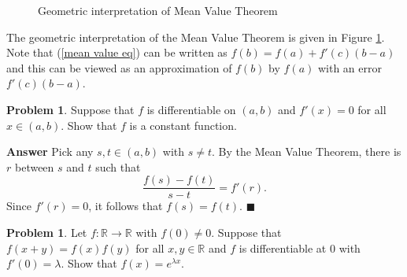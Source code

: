 \documentclass[12pt,letterpaper]{book}
\def\red{\textcolor{red}}
\def\blue{\textcolor{blue}}
\numberwithin{equation}{section}
\theoremstyle{definition}
\newtheorem{problem}[thm]{\textbf{Problem}}
\newenvironment{answer}{\noindent\textbf{Answer}}{\hfill$\blacksquare$\vspace{0.1in}}
\begin{document}
\begin{figure}[h]
\begin{center}
\end{center}
\caption{Geometric interpretation of Mean Value Theorem}
\label{mean value fig}
\end{figure}

The geometric interpretation of the Mean Value Theorem is given in Figure \ref{mean value fig}. Note that (\ref{mean value eq}) can be written as $f(b)=f(a)+f'(c)(b-a)$ and this can be viewed as an approximation of $f(b)$ by $f(a)$ with an error $f'(c)(b-a)$.

\begin{problem}\label{must be constant}
Suppose that $f$ is differentiable on $(a,b)$ and $f'(x)=0$ for all $x\in (a,b)$. Show that $f$ is a constant function.
\end{problem}

\begin{answer}
Pick any $s,t\in (a,b)$ with $s\neq t$. By the Mean Value Theorem, there is $r$ between $s$ and $t$ such that $$\frac{f(s)-f(t)}{s-t}=f'(r).$$ Since $f'(r)=0$, it follows that $f(s)=f(t)$.
\end{answer}

\begin{problem}\label{ftl eqn}
Let $f:\mathbb{R}\to \mathbb{R}$ with $f(0)\neq 0$. Suppose that $f(x+y)=f(x)f(y)$ for all $x,y\in \mathbb{R}$ and $f$ is differentiable at $0$ with $f'(0)=\lambda$. Show that $f(x)=e^{\lambda x}$.
\end{problem}
\end{document}
